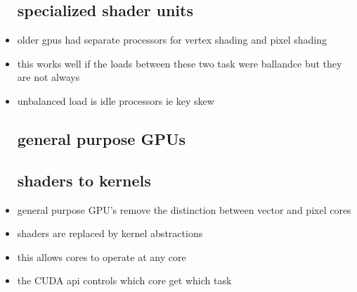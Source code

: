 \documentclass{article}
\begin{document}
\begin{itemize}
\subsection*{specialized shader units}
\item older gpus had separate processors for vertex shading and pixel shading 
\item this works well if the loads between these two task were ballandce but they are not always 
\item unbalanced load is idle processors ie key skew 
\subsection*{general purpose GPUs}
\subsection*{shaders to kernels}
\item general purpose GPU's remove the distinction between vector and pixel cores 
\item shaders are replaced by kernel abstractions 
\item this allows cores to operate at any core 
\item the CUDA api controls which core get which task 

\end{itemize}
\end{document}
